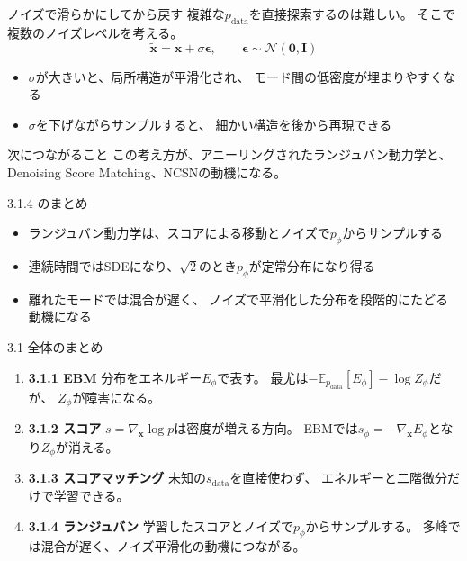 \asmain
\begin{frame}{ノイズで滑らかにしてから戻す}
    複雑な$p_{\mathrm{data}}$を直接探索するのは難しい。
    そこで複数のノイズレベルを考える。
    \[
        \tilde{\bm{x}}
        =
        \bm{x}+\sigma\bm{\epsilon},
        \qquad
        \bm{\epsilon}\sim\mathcal{N}(\bm{0},\bm{I})
\]
    \begin{itemize}
        \item $\sigma$が大きいと、局所構造が平滑化され、
        モード間の低密度が埋まりやすくなる
        \item $\sigma$を下げながらサンプルすると、
        細かい構造を後から再現できる
    \end{itemize}
    \begin{block}{次につながること}
        この考え方が、アニーリングされたランジュバン動力学と、
        Denoising Score Matching、NCSNの動機になる。
    \end{block}
\end{frame}
\asmain
\begin{frame}{3.1.4 のまとめ}
    \begin{itemize}
        \item ランジュバン動力学は、スコアによる移動とノイズで$p_\phi$からサンプルする
        \item 連続時間ではSDEになり、$\sqrt{2}$のとき$p_\phi$が定常分布になり得る
        \item 離れたモードでは混合が遅く、
        ノイズで平滑化した分布を段階的にたどる動機になる
    \end{itemize}
\end{frame}
\asmain
\begin{frame}{3.1 全体のまとめ}
    \begin{enumerate}
        \item \textbf{3.1.1 EBM}
        分布をエネルギー$E_\phi$で表す。
        最尤は$-\mathbb{E}_{p_{\mathrm{data}}}[E_\phi]-\log Z_\phi$だが、
        $Z_\phi$が障害になる。
        \item \textbf{3.1.2 スコア}
        $s=\nabla_{\bm{x}}\log p$は密度が増える方向。
        EBMでは$s_\phi=-\nabla_{\bm{x}}E_\phi$となり$Z_\phi$が消える。
        \item \textbf{3.1.3 スコアマッチング}
        未知の$s_{\mathrm{data}}$を直接使わず、
        エネルギーと二階微分だけで学習できる。
        \item \textbf{3.1.4 ランジュバン}
        学習したスコアとノイズで$p_\phi$からサンプルする。
        多峰では混合が遅く、ノイズ平滑化の動機につながる。
    \end{enumerate}
\end{frame}
